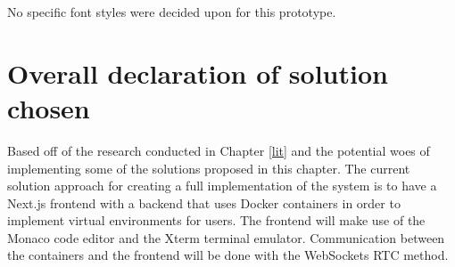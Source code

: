 No specific font styles were decided upon for this prototype.

\section{Overall declaration of solution chosen}

Based off of the research conducted in Chapter \ref{lit} and the potential woes of implementing some of the solutions proposed in this chapter. The current solution approach for creating a full implementation of the system is to have a Next.js frontend with a backend that uses Docker containers in order to implement virtual environments for users. The frontend will make use of the Monaco code editor and the Xterm terminal emulator. Communication between the containers and the frontend will be done with the WebSockets RTC method.



\pagebreak
